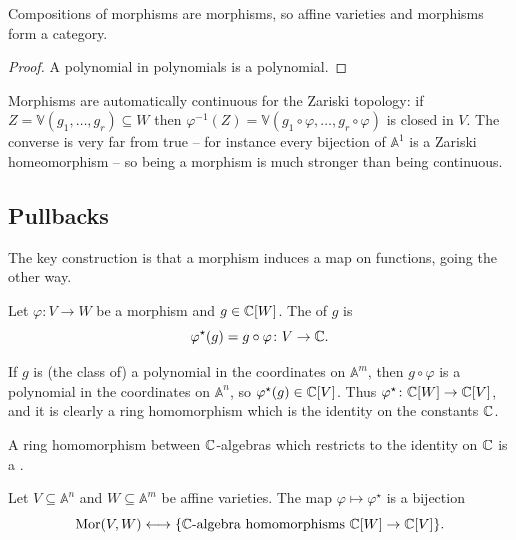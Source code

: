\documentclass[a4paper]{scrartcl}
\newcommand{\A}{\mathbb{A}}
\newcommand{\V}{\mathbb{V}}
\DeclareMathOperator{\Mor}{Mor}
\begin{document}
\begin{proposition}
	Compositions of morphisms are morphisms, so affine varieties and morphisms form a category.
\end{proposition}

\begin{proof}
	A polynomial in polynomials is a polynomial.
\end{proof}

Morphisms are automatically continuous for the Zariski topology: if $Z = \V(g_1,\dots,g_r) \subseteq W$ then $\varphi^{-1}(Z) = \V(g_1 \circ \varphi, \dots, g_r \circ \varphi)$ is closed in $V$. The converse is very far from true -- for instance every bijection of $\A^1$ is a Zariski homeomorphism -- so being a morphism is much stronger than being continuous.

\subsection{Pullbacks}

The key construction is that a morphism induces a map on functions, going the other way.

\begin{definition}[Pullback]
	Let $\varphi \colon V \to W$ be a morphism and $g \in \mathbb{C}[W]$. The  of $g$ is
	$$\varphi^\star(g) = g \circ \varphi \colon V \to \mathbb{C}.$$
\end{definition}

If $g$ is (the class of) a polynomial in the coordinates on $\A^m$, then $g \circ \varphi$ is a polynomial in the coordinates on $\A^n$, so $\varphi^\star(g) \in \mathbb{C}[V]$. Thus $\varphi^\star \colon \mathbb{C}[W] \to \mathbb{C}[V]$, and it is clearly a ring homomorphism which is the identity on the constants $\mathbb{C}$.

\begin{definition}
	A ring homomorphism between $\mathbb{C}$-algebras which restricts to the identity on $\mathbb{C}$ is a .
\end{definition}

\begin{theorem}\label{thm:morequiv}
	Let $V \subseteq \A^n$ and $W \subseteq \A^m$ be affine varieties. The map $\varphi \mapsto \varphi^\star$ is a bijection
	$$\Mor(V,W) \longleftrightarrow \{\C\text{-algebra homomorphisms } \C[W] \to \C[V]\}.$$
\end{theorem}
\end{document}
